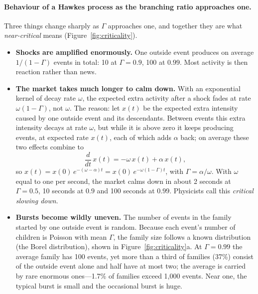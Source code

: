 \paragraph{Behaviour of a Hawkes process as the branching ratio approaches one.} Three things change sharply as $\Gamma$ approaches one, and together they are what \emph{near-critical}
means (Figure~\ref{fig:criticality}).
\begin{itemize}[leftmargin=1.5em,itemsep=2pt]
\item \textbf{Shocks are amplified enormously.} One outside event produces on average $1/(1-\Gamma)$ events in
  total: 10 at $\Gamma = 0.9$, 100 at $0.99$. Most activity is then reaction rather than news.
\item \textbf{The market takes much longer to calm down.} With an exponential kernel of decay rate $\omega$, the
  expected extra activity after a shock fades at rate $\omega(1-\Gamma)$, not $\omega$. The reason:
  let $x(t)$ be the expected extra intensity caused by one outside event and its descendants. Between
  events this extra intensity decays at rate $\omega$, but while it is above zero it keeps producing events,
  at expected rate $x(t)$, each of which adds $\alpha$ back; on average these two effects combine to
  \begin{equation}
    \frac{d}{dt}\,x(t) = -\omega\,x(t) + \alpha\,x(t),
    \label{eq:crit-slow}
  \end{equation}
  so $x(t) = x(0)\,e^{-(\omega - \alpha)t} = x(0)\,e^{-\omega(1-\Gamma)t}$, with $\Gamma = \alpha/\omega$.
  With $\omega$ equal to one per second, the market calms down in about 2 seconds at $\Gamma = 0.5$, 10 seconds at
  $0.9$ and 100 seconds at $0.99$. Physicists call this \emph{critical slowing down}.
\item \textbf{Bursts become wildly uneven.} The number of events in the family started by one outside event is
  random. Because each event's number of children is Poisson with mean $\Gamma$, the family size follows a known
  distribution (the Borel distribution), shown in Figure~\ref{fig:criticality}a. At $\Gamma = 0.99$ the average
  family has 100 events, yet more than a third of families (37\%) consist of the outside event alone and half have
  at most two; the average is carried by rare enormous ones---1.7\% of families exceed 1{,}000 events. Near one,
  the typical burst is small and the occasional burst is huge.
\end{itemize}

